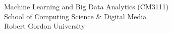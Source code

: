 \begin{titlepage}

  \maketitle
  
  \begin{center}
  
    \vfill
    \Large
    Machine Learning and Big Data Analytics (CM3111)\\
    School of Computing Science \& Digital Media\\
    Robert Gordon University\\
  
  \end{center}
  
\end{titlepage}